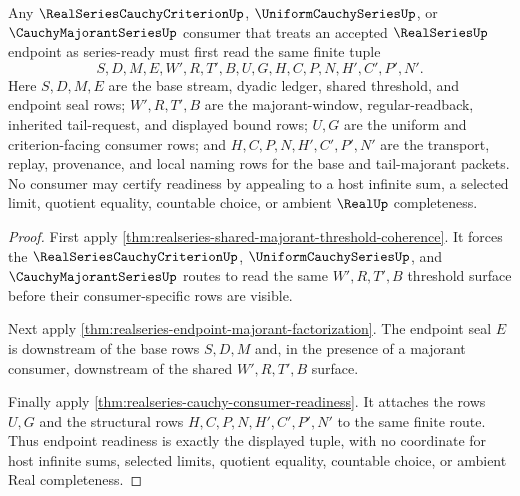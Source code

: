 \begin{theorem}
\label{thm:realseries-majorant-threshold-readiness}
Any $\RealSeriesCauchyCriterionUp$, $\UniformCauchySeriesUp$, or $\CauchyMajorantSeriesUp$ consumer that treats an accepted $\RealSeriesUp$ endpoint as series-ready must first read the same finite tuple
$$
S,D,M,E,W',R,T',B,U,G,H,C,P,N,H',C',P',N' .
$$
Here $S,D,M,E$ are the base stream, dyadic ledger, shared threshold, and endpoint seal rows; $W',R,T',B$ are the majorant-window, regular-readback, inherited tail-request, and displayed bound rows; $U,G$ are the uniform and criterion-facing consumer rows; and $H,C,P,N,H',C',P',N'$ are the transport, replay, provenance, and local naming rows for the base and tail-majorant packets. No consumer may certify readiness by appealing to a host infinite sum, a selected limit, quotient equality, countable choice, or ambient $\RealUp$ completeness.
\end{theorem}
\begin{proof}
First apply \autoref{thm:realseries-shared-majorant-threshold-coherence}. It forces the $\RealSeriesCauchyCriterionUp$, $\UniformCauchySeriesUp$, and $\CauchyMajorantSeriesUp$ routes to read the same $W',R,T',B$ threshold surface before their consumer-specific rows are visible.

Next apply \autoref{thm:realseries-endpoint-majorant-factorization}. The endpoint seal $E$ is downstream of the base rows $S,D,M$ and, in the presence of a majorant consumer, downstream of the shared $W',R,T',B$ surface.

Finally apply \autoref{thm:realseries-cauchy-consumer-readiness}. It attaches the rows $U,G$ and the structural rows $H,C,P,N,H',C',P',N'$ to the same finite route. Thus endpoint readiness is exactly the displayed tuple, with no coordinate for host infinite sums, selected limits, quotient equality, countable choice, or ambient Real completeness.
\end{proof}


